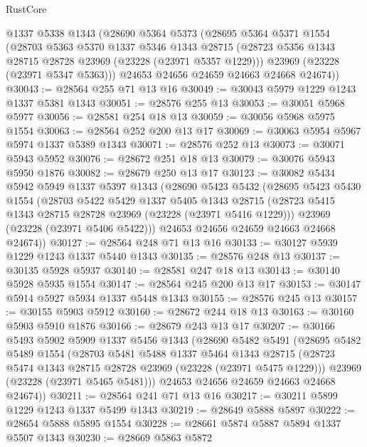 \begin{lexlean}{RustCore}
\begin{coremodule}
    @1337
    @5338
    @1343
    (@28690
      @5364
      @5373
      (@28695
        @5364
        @5371
        @1554
        (@28703
          @5363
          @5370
          @1337
          @5346
          @1343
          @28715
          (@28723 @5356 @1343 @28715 @28728 @23969 (@23228 (@23971 @5357 @1229)))
          @23969
          (@23228 (@23971 @5347 @5363)))
        @24653
        @24656
        @24659
        @24663
        @24668
        @24674))
@30043 := @28564 @255 @71 @13 @16
@30049 := @30043 @5979 @1229 @1243 @1337 @5381 @1343
@30051 := @28576 @255 @13
@30053 := @30051 @5968 @5977
@30056 := @28581 @254 @18 @13
@30059 := @30056 @5968 @5975 @1554
@30063 := @28564 @252 @200 @13 @17
@30069 := @30063 @5954 @5967 @5974 @1337 @5389 @1343
@30071 := @28576 @252 @13
@30073 := @30071 @5943 @5952
@30076 := @28672 @251 @18 @13
@30079 := @30076 @5943 @5950 @1876
@30082 := @28679 @250 @13 @17
@30123 := @30082
    @5434
    @5942
    @5949
    @1337
    @5397
    @1343
    (@28690
      @5423
      @5432
      (@28695
        @5423
        @5430
        @1554
        (@28703
          @5422
          @5429
          @1337
          @5405
          @1343
          @28715
          (@28723 @5415 @1343 @28715 @28728 @23969 (@23228 (@23971 @5416 @1229)))
          @23969
          (@23228 (@23971 @5406 @5422)))
        @24653
        @24656
        @24659
        @24663
        @24668
        @24674))
@30127 := @28564 @248 @71 @13 @16
@30133 := @30127 @5939 @1229 @1243 @1337 @5440 @1343
@30135 := @28576 @248 @13
@30137 := @30135 @5928 @5937
@30140 := @28581 @247 @18 @13
@30143 := @30140 @5928 @5935 @1554
@30147 := @28564 @245 @200 @13 @17
@30153 := @30147 @5914 @5927 @5934 @1337 @5448 @1343
@30155 := @28576 @245 @13
@30157 := @30155 @5903 @5912
@30160 := @28672 @244 @18 @13
@30163 := @30160 @5903 @5910 @1876
@30166 := @28679 @243 @13 @17
@30207 := @30166
    @5493
    @5902
    @5909
    @1337
    @5456
    @1343
    (@28690
      @5482
      @5491
      (@28695
        @5482
        @5489
        @1554
        (@28703
          @5481
          @5488
          @1337
          @5464
          @1343
          @28715
          (@28723 @5474 @1343 @28715 @28728 @23969 (@23228 (@23971 @5475 @1229)))
          @23969
          (@23228 (@23971 @5465 @5481)))
        @24653
        @24656
        @24659
        @24663
        @24668
        @24674))
@30211 := @28564 @241 @71 @13 @16
@30217 := @30211 @5899 @1229 @1243 @1337 @5499 @1343
@30219 := @28649 @5888 @5897
@30222 := @28654 @5888 @5895 @1554
@30228 := @28661 @5874 @5887 @5894 @1337 @5507 @1343
@30230 := @28669 @5863 @5872

\end{coremodule}
\end{lexlean}
